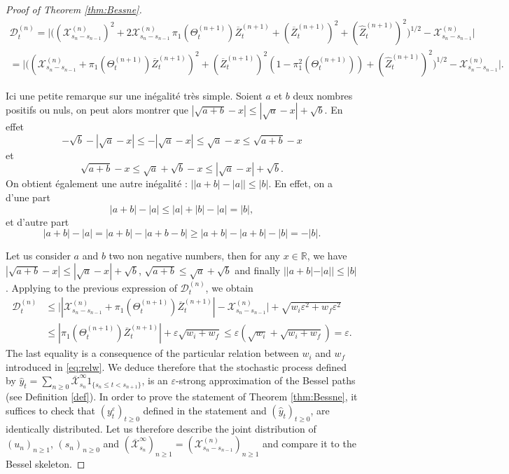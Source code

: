 \documentclass[12pt]{article}
\numberwithin{equation}{section}
\begin{document}
\begin{proof}[Proof of Theorem \ref{thm:Bessne}]
\begin{align*}
\mathcal{D}_t^{(n)}=\Big|\Big((\mathcal{X}^{(n)}_{s_n-s_{n-1}})^2+2\mathcal{X}^{(n)}_{s_n-s_{n-1}}\,\pi_1(\Theta_t^{(n+1)})\overline{Z}_t^{(n+1)} +(\overline{Z}_t^{(n+1)})^2 +(\widehat{Z}_t^{(n+1)})^2 \Big)^{1/2}-\mathcal{X}^{(n)}_{s_n-s_{n-1}} \Big|\\
=\Big|\Big((\mathcal{X}^{(n)}_{s_n-s_{n-1}}+\pi_1(\Theta_t^{(n+1)})\overline{Z}_t^{(n+1)} )^2+(\overline{Z}_t^{(n+1)})^2(1-\pi_1^2(\Theta_t^{(n+1)})) +(\widehat{Z}_t^{(n+1)})^2 \Big)^{1/2}-\mathcal{X}^{(n)}_{s_n-s_{n-1}} \Big|.
\end{align*}
\begin{Calculus} Ici une petite remarque sur une inégalité très simple. Soient $a$ et $b$ deux nombres positifs ou nuls, on peut alors montrer que  $|\sqrt{a+b}-x|\le |\sqrt{a}-x|+\sqrt{b}$. En effet
\[
-\sqrt{b}-|\sqrt{a}-x|\le -|\sqrt{a}-x|\le \sqrt{a}-x \le  \sqrt{a+b}-x 
\]
et
\[
\sqrt{a+b}-x \le \sqrt{a}+\sqrt{b}-x\le |\sqrt{a}-x|+\sqrt{b}.
\]
On obtient également une autre inégalité : $\Big| |a+b|-|a|\Big|\le |b|$. En effet, on a d'une part
\[
|a+b|-|a|\le |a|+|b|-|a|=|b|,
\]
et d'autre part
\[
|a+b|-|a|=|a+b|-|a+b-b|\ge |a+b|-|a+b|-|b|=-|b|.
\]
\end{Calculus}
\noindent Let us consider $a$ and $b$ two non negative numbers, then for any $x\in\mathbb{R}$, we have $|\sqrt{a+b}-x|\le |\sqrt{a}-x|+\sqrt{b}$, $\sqrt{a+b}\le \sqrt{a}+\sqrt{b}$ and finally $| |a+b|-|a||\le |b|$. Applying to the previous expression of $\mathcal{D}_t^{(n)}$, we obtain
\begin{align*}
\mathcal{D}^{(n)}_t&\le \Big| |\mathcal{X}^{(n)}_{s_n-s_{n-1}}+\pi_1(\Theta_t^{(n+1)})\overline{Z}_t^{(n+1)} |-\mathcal{X}^{(n)}_{s_n-s_{n-1}}\Big|+\sqrt{w_i\varepsilon^2+w_f\varepsilon^2}\\
&\le | \pi_1(\Theta_t^{(n+1)})\overline{Z}_t^{(n+1)} |+\varepsilon\sqrt{w_i+w_f}\le \varepsilon(\sqrt{w_i}+ \sqrt{w_i+w_f})=\varepsilon.
\end{align*}
The last equality is a consequence of the particular relation between $w_i$ and $w_f$ introduced in \eqref{eq:relw}. We deduce therefore that the stochastic process defined by $\widehat{y}_t=\sum_{n\ge 0}\overline{\mathcal{X}}^\infty_{s_n}1_{\{s_n\le t<s_{n+1}\}}$, is an $\varepsilon$-strong approximation of the Bessel paths (see Definition \ref{def}). In order to prove the statement of Theorem \ref{thm:Bessne}, it suffices to check that $(y_t^\varepsilon)_{t\ge 0}$ defined in the statement and $(\widehat{y}_t)_{t\ge 0}$, are identically distributed. Let us therefore describe the joint distribution of $(u_n)_{n\ge 1}$, $(s_n)_{n\ge 0}$ and $(\overline{\mathcal{X}}^\infty_{s_n})_{n\ge 1}=(\mathcal{X}^{(n)}_{s_{n}-s_{n-1}})_{n\ge 1}$ and compare it to the Bessel skeleton.

\end{proof}
\end{document}
